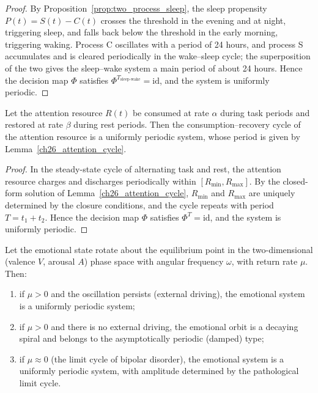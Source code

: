 \begin{proof}
By Proposition~\ref{prop:two_process_sleep}, the sleep propensity $P(t)=S(t)-C(t)$ crosses the threshold in the evening and at night, triggering sleep, and falls back below the threshold in the early morning, triggering waking. Process C oscillates with a period of 24 hours, and process S accumulates and is cleared periodically in the wake--sleep cycle; the superposition of the two gives the sleep--wake system a main period of about 24 hours. Hence the decision map $\Phi$ satisfies $\Phi^{T_{\text{sleep-wake}}}=\mathrm{id}$, and the system is uniformly periodic.
\end{proof}

\begin{lemma}\label{lem:attention_periodic}
Let the attention resource $R(t)$ be consumed at rate $\alpha$ during task periods and restored at rate $\beta$ during rest periods. Then the consumption--recovery cycle of the attention resource is a uniformly periodic system, whose period is given by Lemma~\ref{ch26_attention_cycle}.
\end{lemma}

\begin{proof}
In the steady-state cycle of alternating task and rest, the attention resource charges and discharges periodically within $[R_{\min},R_{\max}]$. By the closed-form solution of Lemma~\ref{ch26_attention_cycle}, $R_{\min}$ and $R_{\max}$ are uniquely determined by the closure conditions, and the cycle repeats with period $T=t_1+t_2$. Hence the decision map $\Phi$ satisfies $\Phi^T=\mathrm{id}$, and the system is uniformly periodic.
\end{proof}

\begin{lemma}\label{lem:emotion_periodic}
Let the emotional state rotate about the equilibrium point in the two-dimensional (valence $V$, arousal $A$) phase space with angular frequency $\omega$, with return rate $\mu$. Then:
\begin{enumerate}[label=(\roman*)]
    \item if $\mu>0$ and the oscillation persists (external driving), the emotional system is a uniformly periodic system;
    \item if $\mu>0$ and there is no external driving, the emotional orbit is a decaying spiral and belongs to the asymptotically periodic (damped) type;
    \item if $\mu\approx 0$ (the limit cycle of bipolar disorder), the emotional system is a uniformly periodic system, with amplitude determined by the pathological limit cycle.
\end{enumerate}
\end{lemma}

